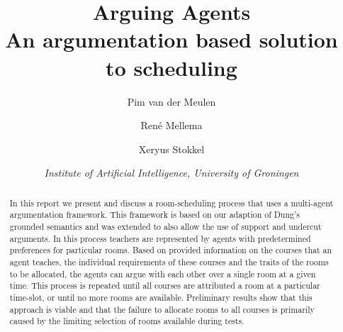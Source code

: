 \documentclass[a4paper]{article}
\title{\textbf{\huge Arguing Agents\\An argumentation based solution to
        scheduling}}
\author{Pim van der Meulen\and Ren\'e Mellema \and Xeryus Stokkel}
\date{\textit{Institute of Artificial Intelligence, University of
        Groningen}}
\theoremstyle{definition}
\begin{document}
\ttl{}
\thispagestyle{empty}

\begin{abstract}
    \noindent
In this report we present and discuss a room-scheduling process that uses a 
multi-agent argumentation framework. This framework is based on our 
adaption of Dung's grounded semantics \cite{dungargfund} and was extended 
to also allow the use of support and undercut arguments. In this process 
teachers are represented by agents with predetermined preferences for 
particular rooms. Based on provided information on the courses that an 
agent teaches, the individual requirements of these courses and the traits 
of the rooms to be allocated, the agents can argue with each other over a 
single room at a given time. This process is repeated until all courses are 
attributed a room at a particular time-slot, or until no more rooms are 
available. Preliminary results show that this approach is viable and that 
the failure to allocate rooms to all courses is primarily caused by the 
limiting selection of rooms available during tests.
\end{abstract}














\FloatBarrier
\appendix

\end{document}
